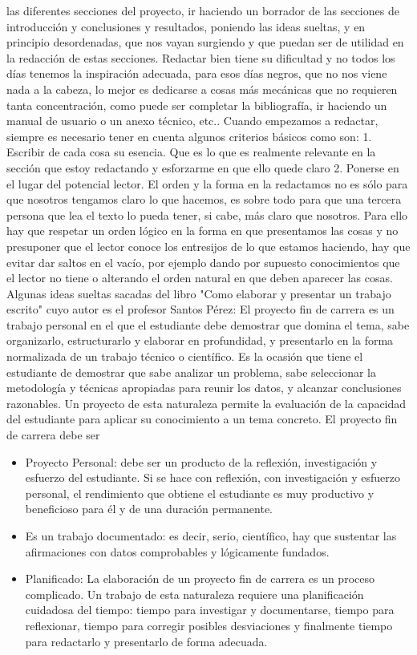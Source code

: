 \documentclass[12pt,a4paper,spanish]{book}
\begin{document}
las diferentes secciones del proyecto, ir haciendo un borrador de las
secciones de introducción y conclusiones y resultados,
poniendo las ideas sueltas, y en principio desordenadas, que nos
vayan surgiendo y que puedan ser de utilidad en la redacción
de estas secciones. Redactar bien tiene su dificultad y no todos los
días tenemos la inspiración adecuada, para esos días
negros, que no nos viene nada a la cabeza, lo mejor es dedicarse a
cosas más mecánicas que no requieren tanta concentración,
como puede ser completar la bibliografía, ir haciendo un manual de
usuario o un anexo técnico, etc..
Cuando empezamos a redactar, siempre es necesario tener en cuenta
algunos criterios básicos como son:
1. Escribir de cada cosa su esencia. Que es lo que es realmente
relevante en la sección que estoy redactando y esforzarme
en que ello quede claro
2. Ponerse en el lugar del potencial lector. El orden y la forma en
la redactamos no es sólo para que nosotros tengamos
claro lo que hacemos, es sobre todo para que una tercera persona que
lea el texto lo pueda tener, si cabe, más claro
que nosotros. Para ello hay que respetar un orden lógico en la forma
en que presentamos las cosas y no presuponer que
el lector conoce los entresijos de lo que estamos haciendo, hay que
evitar dar saltos en el vacío, por ejemplo dando
por supuesto conocimientos que el lector no tiene o alterando el
orden natural en que deben aparecer las cosas.
Algunas ideas sueltas sacadas del libro "Como elaborar y presentar un
trabajo escrito" cuyo autor es el profesor Santos Pérez:
El proyecto fin de carrera es un trabajo personal en el que el
estudiante debe demostrar que domina el tema, sabe organizarlo,
estructurarlo y elaborar en profundidad, y presentarlo en la forma
normalizada de un trabajo técnico o científico. Es la
ocasión que tiene el estudiante de demostrar que sabe analizar un
problema, sabe seleccionar la metodología y técnicas
apropiadas para reunir los datos, y alcanzar conclusiones razonables.
Un proyecto de esta naturaleza permite la evaluación
de la capacidad del estudiante para aplicar su conocimiento a un tema
concreto.
El proyecto fin de carrera debe ser
\begin{itemize}
\item Proyecto Personal: debe ser un producto de la reflexión,
investigación y esfuerzo del estudiante. Si se hace con
 reflexión, con investigación y esfuerzo personal, el
rendimiento que obtiene el estudiante es muy productivo y
 beneficioso para él y de una duración permanente.
\item Es un trabajo documentado: es decir, serio, científico, hay
que sustentar las afirmaciones con datos comprobables
 y lógicamente fundados.
\item Planificado: La elaboración de un proyecto fin de carrera es
un proceso complicado. Un trabajo de esta naturaleza
 requiere una planificación cuidadosa del tiempo: tiempo para
investigar y documentarse, tiempo para reflexionar,
 tiempo para corregir posibles desviaciones y finalmente tiempo
para redactarlo y presentarlo de forma adecuada.
\end{itemize}
\end{document}
